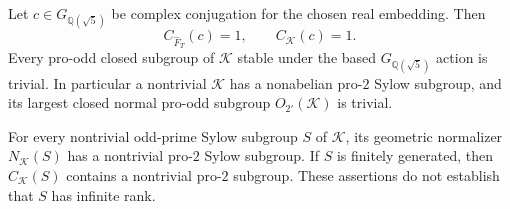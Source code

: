 Let $c\in G_{\mathbb Q(\sqrt5)}$ be complex
conjugation for the chosen real embedding.
Then
\[
 C_{\widehat F_T}(c)=1,\qquad C_{\mathcal K}(c)=1.            \tag{B.51.1}
\]
Every pro-odd closed subgroup of $\mathcal K$
stable under the based $G_{\mathbb Q(\sqrt5)}$
action is trivial.  In particular a nontrivial
$\mathcal K$ has a nonabelian pro-$2$ Sylow
subgroup, and its largest closed normal
pro-odd subgroup $O_{2'}(\mathcal K)$ is
trivial.

For every nontrivial odd-prime Sylow subgroup
$S$ of $\mathcal K$, its geometric normalizer
$N_{\mathcal K}(S)$ has a nontrivial pro-$2$
Sylow subgroup.  If $S$ is finitely generated,
then $C_{\mathcal K}(S)$ contains a nontrivial
pro-$2$ subgroup.  These assertions do not
establish that $S$ has infinite rank.

